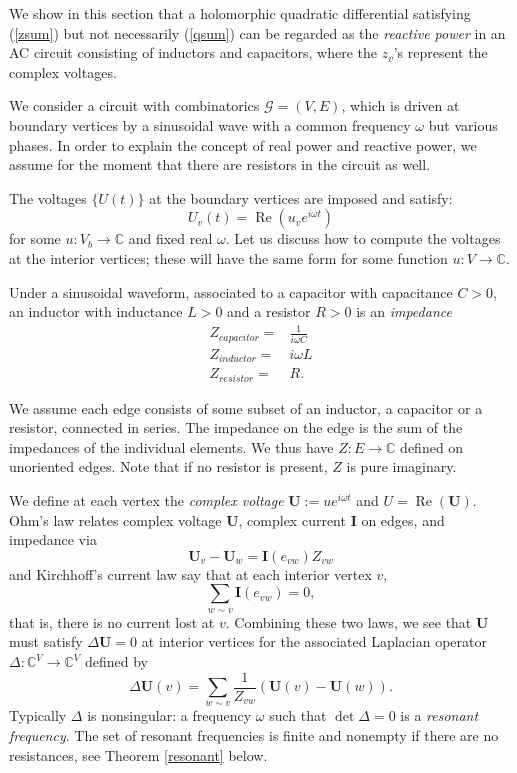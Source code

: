 \documentclass[12pt]{amsart}
\DeclareMathOperator{\Real}{Re}
\renewcommand{\Re}{\Real}
\newcommand{\C}{{\mathbb C}}
\newcommand{\U}{\mathbf U}
\newcommand{\I}{\mathbf I}
\begin{document}
We show in this section that a holomorphic quadratic differential satisfying (\ref{zsum}) but not necessarily (\ref{qsum})
can be regarded as the \emph{reactive power} in an AC circuit consisting of inductors and capacitors, where the $z_v$'s represent the complex voltages. 

We consider a circuit with combinatorics $\mathcal{G}=(V,E)$, which is driven at boundary vertices 
by a sinusoidal wave with a common frequency $\omega$ but various phases. 
In order to explain the concept of real power and reactive power, 
we assume for the moment that there are resistors in the circuit as well. 

The voltages $\{U(t)\}$ at the boundary vertices are imposed and satisfy:
\[
U_v(t) = \Re(u_v e^{i\omega t}) 
\]
for some $u:V_b \to \C$ and fixed real $\omega$. 
Let us discuss how to compute the voltages at the interior vertices; these will have the same form for some 
function $u:V\to\C$. 

Under a sinusoidal waveform, associated to a capacitor with capacitance $C>0$, 
an inductor with inductance $L > 0$ and a resistor $R > 0$ is an \emph{impedance}
\begin{align*}
Z_{capacitor} =& \frac{1}{i \omega C} \\
Z_{inductor} =& i \omega L \\
Z_{resistor} =& R.
\end{align*}

We assume each edge consists of some subset of an inductor, a capacitor or a resistor, connected in series. 
The impedance on the edge is the sum of the impedances of the individual elements. We 
thus have $Z:E \to\C$ defined on unoriented edges. 
Note that if no resistor is present, $Z$ is pure imaginary. 

We define at each vertex the \emph{complex voltage} $\U:= u e^{i\omega t}$ and $U = \Re( \U)$. 
Ohm's law relates complex voltage $\U$, complex current $\I$ on edges, and impedance via
\[
\U_v  - \U_w= \I(e_{vw}) Z_{vw}
\]
and Kirchhoff's current law say that at each interior vertex $v$,
$$\sum_{w\sim v} \I(e_{vw})=0,$$
that is, there is no current lost at $v$.
Combining these two laws, we see that $\U$ must satisfy $\Delta\U=0$ at interior vertices for the 
associated Laplacian operator $\Delta:\C^V\to \C^V$ defined by
$$\Delta \U(v) = \sum_{w\sim v}\frac1{Z_{vw}}(\U(v)-\U(w)).$$
Typically $\Delta$ is nonsingular:
a frequency $\omega$ such that $\det\Delta=0$ is a \emph{resonant frequency}. The set of resonant
frequencies is finite  and nonempty if there are no resistances, see Theorem \ref{resonant} below.
\end{document}

